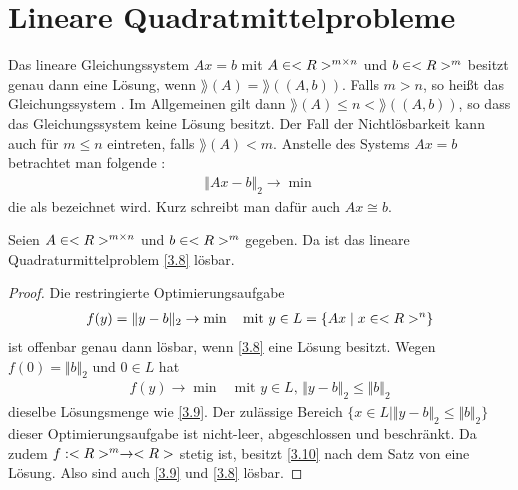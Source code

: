 \section{Lineare Quadratmittelprobleme}

Das lineare Gleichungssystem $Ax=b$ mit $A\in<R>^{m\times n}$ und $b\in<R>^m$ besitzt genau dann eine Lösung, wenn $\rang(A)=\rang((A,b))$. Falls $m>n$, so heißt das Gleichungssystem . Im Allgemeinen gilt dann $\rang(A)\le n<\rang((A,b))$, so dass das Gleichungssystem keine Lösung besitzt. Der Fall der Nichtlösbarkeit kann auch für $m\le n$ eintreten, falls $\rang(A)<m$. Anstelle des Systems $Ax=b$ betrachtet man folgende :
\begin{align}
	\label{3.8}
	\Vert Ax-b\Vert_2\to\min
\end{align}
die als  bezeichnet wird. Kurz schreibt man dafür auch $Ax\cong b$.

\begin{proposition}
	Seien $A\in<R>^{m\times n}$ und $b\in<R>^m$ gegeben. Da ist das lineare Quadraturmittelproblem \cref{3.8} lösbar.
\end{proposition}
\begin{proof}
	Die restringierte Optimierungsaufgabe 
	\begin{align}
		\label{3.9}
		f(y) = \Vert y-b\Vert_2\to\min\quad\text{mit } y\in L=\{Ax\mid x\in<R>^n\}
	\end{align}
	ist offenbar genau dann lösbar, wenn \cref{3.8} eine Lösung besitzt. Wegen $f(0)=\Vert b\Vert_2$ und $0\in L$ hat
	\begin{align}
		\label{3.10}
		f(y)\to\min\quad\text{mit } y\in L, \, \Vert y-b\Vert_2\le \Vert b\Vert_2
	\end{align}
	dieselbe Lösungsmenge wie \cref{3.9}. Der zulässige Bereich $\{x\in L\mid \Vert y-b\Vert_2\le \Vert b\Vert_2\}$ dieser Optimierungsaufgabe ist nicht-leer, abgeschlossen und beschränkt. Da zudem $f:<R>^m\to<R>$ stetig ist, besitzt \cref{3.10} nach dem Satz von  eine Lösung. Also sind auch \cref{3.9} und \cref{3.8} lösbar.
\end{proof}

